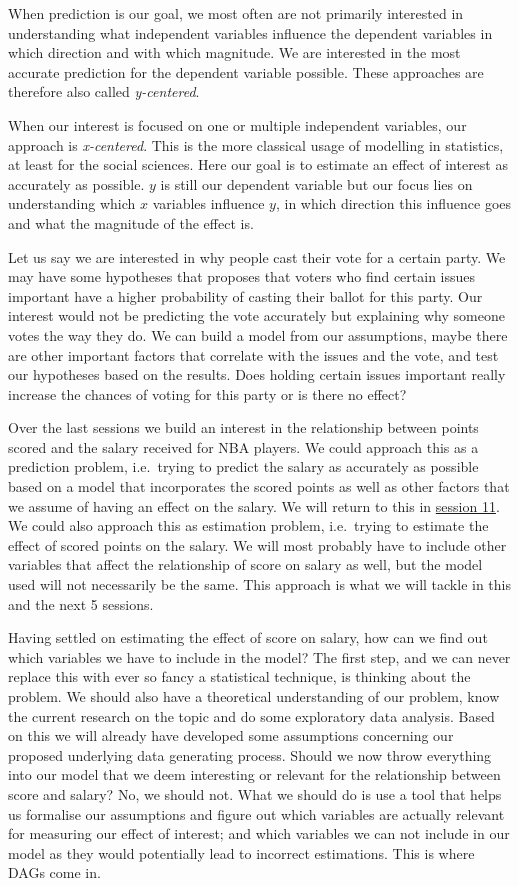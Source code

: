 \documentclass[
]{book}
\begin{document}
When prediction is our goal, we most often are not primarily interested
in understanding what independent variables influence the dependent
variables in which direction and with which magnitude. We are interested
in the most accurate prediction for the dependent variable possible.
These approaches are therefore also called \emph{y-centered}.

When our interest is focused on one or multiple independent variables,
our approach is \emph{x-centered}. This is the more classical usage of
modelling in statistics, at least for the social sciences. Here our goal
is to estimate an effect of interest as accurately as possible. \(y\) is
still our dependent variable but our focus lies on understanding which
\(x\) variables influence \(y\), in which direction this influence goes and
what the magnitude of the effect is.

Let us say we are interested in why people cast their vote for a certain
party. We may have some hypotheses that proposes that voters who find
certain issues important have a higher probability of casting their
ballot for this party. Our interest would not be predicting the vote
accurately but explaining why someone votes the way they do. We can
build a model from our assumptions, maybe there are other important
factors that correlate with the issues and the vote, and test our
hypotheses based on the results. Does holding certain issues important
really increase the chances of voting for this party or is there no
effect?

Over the last sessions we build an interest in the relationship between
points scored and the salary received for NBA players. We could approach
this as a prediction problem, i.e.~trying to predict the salary as
accurately as possible based on a model that incorporates the scored
points as well as other factors that we assume of having an effect on
the salary. We will return to this in \protect\hyperlink{pm-t}{session 11}. We could also
approach this as estimation problem, i.e.~trying to estimate the effect
of scored points on the salary. We will most probably have to include
other variables that affect the relationship of score on salary as well,
but the model used will not necessarily be the same. This approach is
what we will tackle in this and the next 5 sessions.

Having settled on estimating the effect of score on salary, how can we
find out which variables we have to include in the model? The first
step, and we can never replace this with ever so fancy a statistical
technique, is thinking about the problem. We should also have a
theoretical understanding of our problem, know the current research on
the topic and do some exploratory data analysis. Based on this we will
already have developed some assumptions concerning our proposed
underlying data generating process. Should we now throw everything into
our model that we deem interesting or relevant for the relationship
between score and salary? No, we should not. What we should do is use a
tool that helps us formalise our assumptions and figure out which
variables are actually relevant for measuring our effect of interest;
and which variables we can not include in our model as they would
potentially lead to incorrect estimations. This is where DAGs come in.
\end{document}
